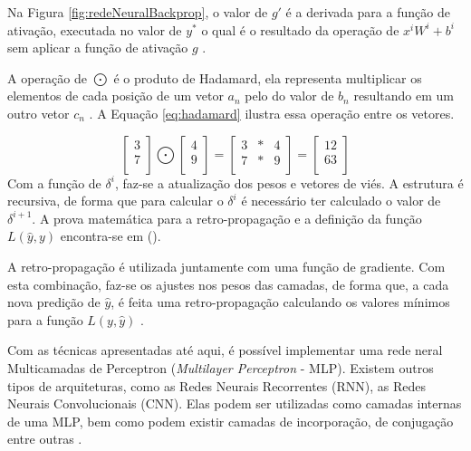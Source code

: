 Na Figura \ref{fig:redeNeuralBackprop}, o valor de $g'$ é a derivada para a função de ativação, executada no valor de $y^{*}$ o qual é o resultado da operação de $x^{i}W^{i} + b^{i}$ sem aplicar a função de ativação $g$ \cite{NIELSEN2015}.

A operação de $\bigodot$ é o produto de Hadamard, ela representa multiplicar os elementos de cada posição de um vetor $a_{n}$ pelo do valor de $b_{n}$ resultando em um outro vetor $c_{n}$ \cite{NIELSEN2015}. A Equação \ref{eq:hadamard} ilustra essa operação entre os vetores.

\begin{equation}
	\label{eq:hadamard}
	\begin{bmatrix}
    	3 \\
        7 \\
	\end{bmatrix}
    \bigodot
    \begin{bmatrix}
    	4 \\
        9 \\
	\end{bmatrix}
    =
    \begin{bmatrix}
       3 & * & 4 \\
       7 & * & 9 \\
    \end{bmatrix}
     =
    \begin{bmatrix}
    	12 \\
        63 \\
	\end{bmatrix}     
\end{equation}
Com a função de $\delta^{i}$, faz-se a atualização dos pesos e vetores de viés. A estrutura é recursiva, de forma que para calcular o $\delta^{i}$ é necessário ter calculado o valor de $\delta^{i+1}$. A prova matemática para a retro-propagação e a definição da função $L(\hat{y}, y)$ encontra-se em \citeauthor{NIELSEN2015} (\citeyear{NIELSEN2015}).

A retro-propagação é utilizada juntamente com uma função de gradiente. Com esta combinação, faz-se os ajustes nos pesos das camadas, de forma que, a cada nova predição de $\hat{y}$, é feita uma retro-propagação calculando os valores mínimos para a função $L(y, \hat{y})$ \cite{NIELSEN2015}.

Com as técnicas apresentadas até aqui, é possível implementar uma rede neral Multicamadas de Perceptron (\textit{Multilayer Perceptron} - MLP). Existem outros tipos de arquiteturas, como as Redes Neurais Recorrentes (RNN), as Redes Neurais Convolucionais (CNN). Elas podem ser utilizadas como camadas internas de uma MLP, bem como podem existir camadas de incorporação, de conjugação entre outras \cite{GOLDBERG2017}.

